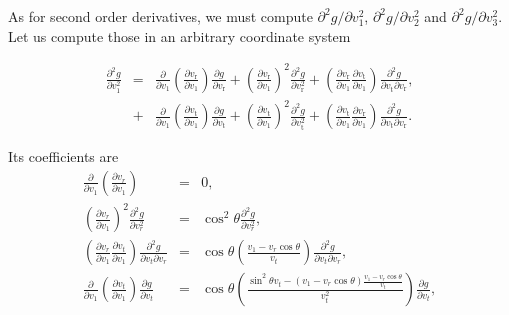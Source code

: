 \documentclass[11pt]{article}
\newcommand{\rt}{\mathrm{t}}
\newcommand{\rr}{\mathrm{r}}
\newcommand{\vr}{v_{\rr}}
\newcommand{\vt}{v_{\rt}}
\begin{document}
\begin{appendices}
As for second order derivatives, we must compute ${\partial^{2}g}/{\partial v_{1}^{2}}$, ${\partial^{2}g}/{\partial v_{2}^{2}}$ and ${\partial^{2}g}/{\partial v_{3}^{2}}$. Let us compute those in an arbitrary coordinate system

\begin{equation}
\begin{array}{ccl}
  \displaystyle{\frac{\partial^{2}g}{\partial v_{1}^{2}}}&=& \displaystyle{\frac{\partial}{\partial v_{1}}\left(\frac{\partial \vr}{\partial v_{1}}\right)\frac{\partial g}{\partial \vr}+\left(\frac{\partial \vr}{\partial v_{1}}\right)^{2}\frac{\partial^{2}g}{\partial \vr^{2}}+\left(\frac{\partial \vr}{\partial v_{1}}\frac{\partial \vt}{\partial v_{1}}\right)\frac{\partial^{2}g}{\partial \vt\partial \vr}} ,\\

  {} &+& \displaystyle{\frac{\partial}{\partial v_{1}}\left(\frac{\partial \vt}{\partial v_{1}}\right)\frac{\partial g}{\partial \vt}+\left(\frac{\partial \vt}{\partial v_{1}}\right)^{2}\frac{\partial^{2}g}{\partial \vt^{2}}+\left(\frac{\partial \vt}{\partial v_{1}}\frac{\partial \vr}{\partial v_{1}}\right)\frac{\partial^{2}g}{\partial \vt\partial \vr}} .
\end{array}
\label{eq:d2gdv12_Arbitrary}
\end{equation}

Its coefficients are
\begin{equation}
\begin{array}{ccl}
  \displaystyle{\frac{\partial}{\partial v_{1}}\left(\frac{\partial v_{r}}{\partial v_{1}}\right)}&=& \displaystyle{0} ,\\
  \displaystyle{\left(\frac{\partial v_{r}}{\partial v_{1}}\right)^{2}\frac{\partial^{2}g}{\partial v_{r}^{2}}}&=& \displaystyle{\cos^{2}\theta\frac{\partial^{2}g}{\partial v_{r}^{2}}} ,\\
  \displaystyle{\left(\frac{\partial v_{r}}{\partial v_{1}}\frac{\partial v_{t}}{\partial v_{1}}\right)\frac{\partial^{2}g}{\partial v_{t}\partial v_{r}}}&=& \displaystyle{\cos\theta\left(\frac{v_{1}-v_{r}\cos\theta}{v_{t}}\right)\frac{\partial^{2}g}{\partial v_{t}\partial v_{r}}} ,\\
  \displaystyle{\frac{\partial}{\partial v_{1}}\left(\frac{\partial v_{t}}{\partial v_{1}}\right)\frac{\partial g}{\partial v_{t}}}&=& \displaystyle{\cos\theta\left(\frac{\sin^{2}\theta v_{t}-(v_{1}-v_{r}\cos\theta)\frac{v_{1}-v_{r}\cos\theta}{v_{t}}}{v_{t}^{2}}\right)\frac{\partial g}{\partial v_{t}}} ,\\
 


\end{array}
\end{equation}
\end{appendices}
\end{document}

